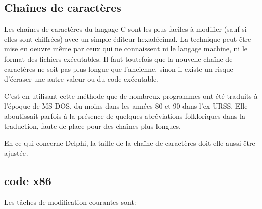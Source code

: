 ﻿

\subsection{Chaînes de caractères}

Les chaînes de caractères du langage C sont les plus faciles à modifier (sauf si elles sont chiffrées)
avec un simple éditeur hexadécimal. La technique peut être mise en oeuvre même par ceux qui ne
connaissent ni le langage machine, ni le format des fichiers exécutables.
Il faut toutefois que la nouvelle chaîne de caractères ne soit pas plus longue que l'ancienne, sinon 
il existe un risque d'écraser une autre valeur ou du code exécutable.


C'est en utilisant cette méthode que de nombreux programmes ont été traduits à l'époque de MS-DOS,
du moins dans les années 80 et 90 dans l'ex-URSS. Elle aboutissait parfois à la présence de quelques abréviations folkloriques dans la traduction, faute de place pour des chaînes plus longues.


En ce qui concerne Delphi, la taille de la chaîne de caractères doit elle aussi être ajustée.

\subsection{code x86}
\label{x86_patching}

Les tâches de modification courantes sont:

